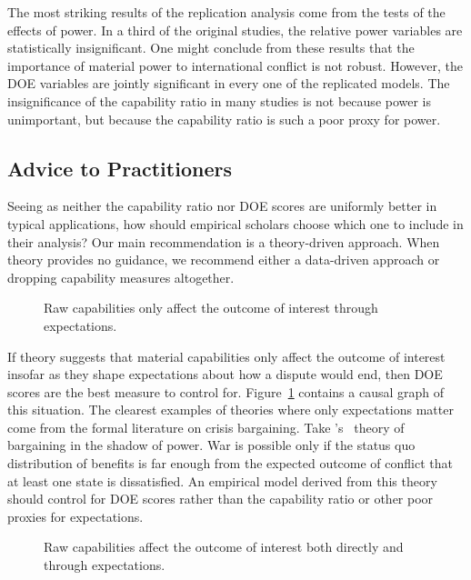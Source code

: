 The most striking results of the replication analysis come from the tests of the effects of power.
In a third of the original studies, the relative power variables are statistically insignificant.
One might conclude from these results that the importance of material power to international conflict is not robust.
However, the DOE variables are jointly significant in every one of the replicated models.
The insignificance of the capability ratio in many studies is not because power is unimportant, but because the capability ratio is such a poor proxy for power.


\subsection{Advice to Practitioners}

Seeing as neither the capability ratio nor DOE scores are uniformly better in typical applications, how should empirical scholars choose which one to include in their analysis?
Our main recommendation is a theory-driven approach.
When theory provides no guidance, we recommend either a data-driven approach or dropping capability measures altogether.

\begin{figure}[htp]
  \centering
  
  \caption{
    Raw capabilities only affect the outcome of interest through expectations.
  }
  \label{fig:dag-cap0-doe1}
\end{figure}

If theory suggests that material capabilities only affect the outcome of interest insofar as they shape expectations about how a dispute would end, then DOE scores are the best measure to control for.
Figure~\ref{fig:dag-cap0-doe1} contains a causal graph of this situation.
The clearest examples of theories where only expectations matter come from the formal literature on crisis bargaining.
Take \citeauthor{powell1999}'s~\citeyearpar{powell1999} theory of bargaining in the shadow of power.
War is possible only if the status quo distribution of benefits is far enough from the expected outcome of conflict that at least one state is dissatisfied.
An empirical model derived from this theory should control for DOE scores rather than the capability ratio or other poor proxies for expectations.

\begin{figure}[htp]
  \centering
  
  \caption{
    Raw capabilities affect the outcome of interest both directly and through expectations.
  }
  \label{fig:dag-cap1-doe1}
\end{figure}

